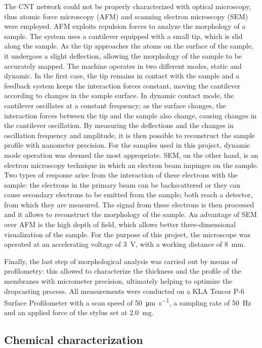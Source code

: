 The CNT network could not be properly characterized with optical microscopy, thus atomic force microscopy (AFM) and scanning electron microscopy (SEM) were employed. AFM exploits repulsion forces to analyze the morphology of a sample. The system uses a cantilever equipped with a small tip, which is slid along the sample. As the tip approaches the atoms on the surface of the sample, it undergoes a slight deflection, allowing the morphology of the sample to be accurately mapped. The machine operates in two different modes, static and dynamic. In the first case, the tip remains in contact with the sample and a feedback system keeps the interaction forces constant, moving the cantilever according to changes in the sample surface. In dynamic contact mode, the cantilever oscillates at a constant frequency; as the surface changes, the interaction forces between the tip and the sample also change, causing changes in the cantilever oscillation. By measuring the deflections and the changes in oscillation frequency and amplitude, it is then possible to reconstruct the sample profile with nanometer precision. For the samples used in this project, dynamic mode operation was deemed the most appropriate.
SEM, on the other hand, is an electron microscopy technique in which an electron beam impinges on the sample. Two types of response arise from the interaction of these electrons with the sample: the electrons in the primary beam can be backscattered or they can cause secondary electrons to be emitted from the sample; both reach a detector, from which they are measured. The signal from these electrons is then processed and it allows to reconstruct the morphology of the sample. An advantage of SEM over AFM is the high depth of field, which allows better three-dimensional visualization of the sample. For the purpose of this project, the microscope was operated at an accelerating voltage of \SI{3}{\V}, with a working distance of \SI{8}{\mm}.

Finally, the last step of morphological analysis was carried out by means of profilometry: this allowed to characterize the thickness and the profile of the membranes with micrometer precision, ultimately helping to optimize the dropcasting process.
All measurements were conducted on a KLA Tencor P-6 Surface Profilometer with a scan speed of \SI{50}{\um\per\s}, a sampling rate of \SI{50}{\Hz} and an applied force of the stylus set at \SI{2.0}{\mg}.

\subsection{Chemical characterization}
\label{sec:chemCharacterization}

